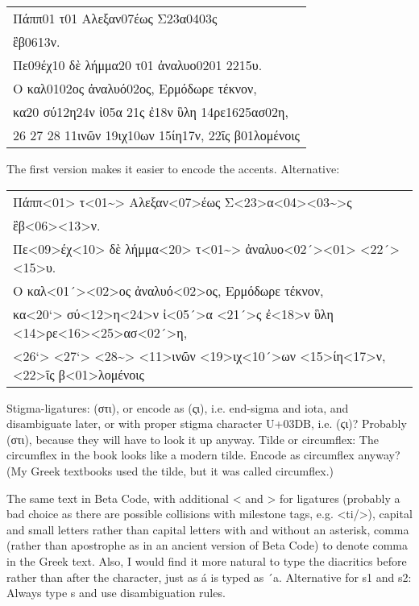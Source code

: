 \begin{typeGreek}
\begin{tabular}{l}
Πάππ01 τ01 Αλεξαν07έως Σ23α0403ς \\ 
ἓβ0613ν. \\ 
Πε09έχ10 δὲ λήμμα20 τ01 ἀναλυο0201 2215υ. \\ 
Ο καλ0102ος ἀναλυό02ος, Ερμόδωρε τέκνον, \\ 
κα20 σύ12η24ν ἰ05α 21ς ἐ18ν ὓλη 14ρε1625ασ02η, \\ 
26 27 28  11ινῶν 19ιχ10ων 15ίη17ν, 22ῖς β01λομένοις \\ 
\end{tabular}
\end{typeGreek}

The first version makes it easier to encode the accents. Alternative: 

\begin{typeGreek}
\begin{tabular}{l}
Πάππ<01> τ<01\textasciitilde> Αλεξαν<07>έως Σ<23>α<04><03\textasciitilde>ς \\ 
ἓβ<06><13>ν. \\ 
Πε<09>έχ<10> δὲ λήμμα<20> τ<01\textasciitilde> ἀναλυο<02´><01> <22´><15>υ. \\ 
Ο καλ<01´><02>ος ἀναλυό<02>ος, Ερμόδωρε τέκνον, \\ 
κα<20`> σύ<12>η<24>ν ἰ<05´>α <21´>ς ἐ<18>ν ὓλη <14>ρε<16><25>ασ<02´>η, \\ 
<26`> <27`> <28\textasciitilde>  <11>ινῶν <19>ιχ<10´>ων <15>ίη<17>ν, <22>ῖς β<01>λομένοις \\ 
\end{tabular}
\end{typeGreek}

Stigma-ligatures: (στι), or encode as (ςι), i.e. end-sigma and iota, and disambiguate later, or with proper stigma character U+03DB, i.e. (ϛι)? Probably (στι), because they will have to look it up anyway. Tilde or circumflex: The circumflex in the book looks like a modern tilde. Encode as circumflex anyway? (My Greek textbooks used the tilde, but it was called circumflex.)

The same text in Beta Code, with additional < and > for ligatures (probably a bad choice as there are possible collisions with milestone tags, e.g. <ti/>), capital and small letters rather than capital letters with and without an asterisk, comma (rather than apostrophe as in an ancient version of  Beta Code) to denote comma in the Greek text. Also, I would find it more natural to type the diacritics before rather than after the character, just as á is typed as ´a. Alternative for s1 and s2: Always type s and use disambiguation rules.

